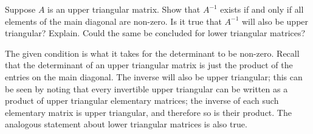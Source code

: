 \begin{ex}
  Suppose $A$ is an upper triangular matrix. Show that $A^{-1}$ exists
  if and only if all elements of the main diagonal are non-zero. Is it
  true that $A^{-1}$ will also be upper triangular? Explain. Could the
  same be concluded for lower triangular matrices?
  \begin{sol}
    The given condition is what it takes for the determinant to be
    non-zero. Recall that the determinant of an upper triangular
    matrix is just the product of the entries on the main diagonal.
    The inverse will also be upper triangular; this can be seen by
    noting that every invertible upper triangular can be written as a
    product of upper triangular elementary matrices; the inverse of
    each such elementary matrix is upper triangular, and therefore so
    is their product. The analogous statement about lower triangular
    matrices is also true.
  \end{sol}
\end{ex}

